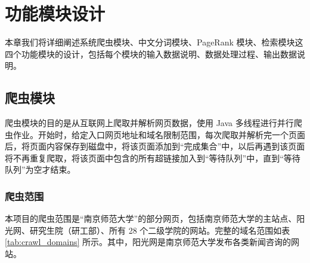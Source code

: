 \documentclass{ctexart}
\begin{document}
    \section{功能模块设计}\label{sec:modules}

    本章我们将详细阐述系统爬虫模块、中文分词模块、PageRank 模块、检索模块这四个功能模块的设计，包括每个模块的输入数据说明、数据处理过程、输出数据说明。

    \subsection{爬虫模块}\label{subsec:crawl}

    爬虫模块的目的是从互联网上爬取并解析网页数据，使用 Java 多线程进行并行爬虫作业。开始时，给定入口网页地址和域名限制范围，每次爬取并解析完一个页面后，将页面内容保存到磁盘中，将该页面添加到“完成集合”中，以后再遇到该页面将不再重复爬取，将该页面中包含的所有超链接加入到“等待队列”中，直到“等待队列”为空才结束。

    \subsubsection{爬虫范围}\label{subsubsec:crawl_scope}

    本项目的爬虫范围是“南京师范大学”的部分网页，包括南京师范大学的主站点、阳光网、研究生院（研工部）、所有 28 个二级学院的网站。完整的域名范围如表\ref{tab:crawl_domains} 所示。其中，阳光网是南京师范大学发布各类新闻咨询的网站。
\end{document}
